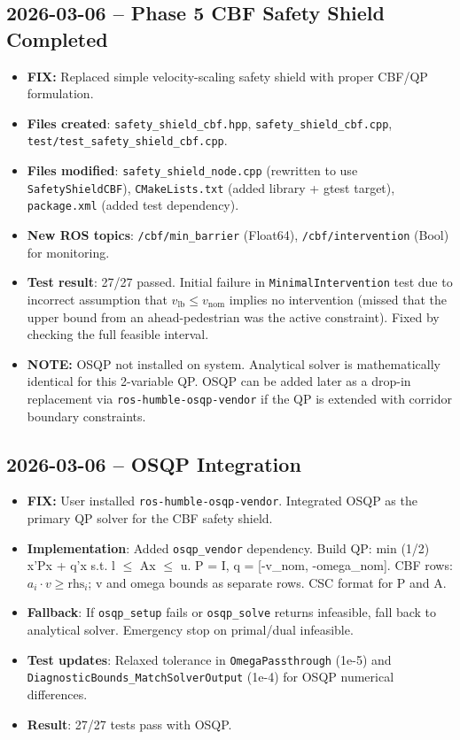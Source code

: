 \documentclass[11pt]{article}
\newcommand{\logentry}[1]{\subsection*{#1}}
\newcommand{\fix}[1]{\textcolor{fixgreen}{\textbf{FIX:} #1}}
\newcommand{\note}[1]{\textcolor{notblue}{\textbf{NOTE:} #1}}
\begin{document}
\logentry{2026-03-06 -- Phase 5 CBF Safety Shield Completed}
\begin{itemize}
  \item \fix{Replaced simple velocity-scaling safety shield with proper CBF/QP formulation.}
  \item \textbf{Files created}: \texttt{safety\_shield\_cbf.hpp}, \texttt{safety\_shield\_cbf.cpp}, \texttt{test/test\_safety\_shield\_cbf.cpp}.
  \item \textbf{Files modified}: \texttt{safety\_shield\_node.cpp} (rewritten to use \texttt{SafetyShieldCBF}), \texttt{CMakeLists.txt} (added library + gtest target), \texttt{package.xml} (added test dependency).
  \item \textbf{New ROS topics}: \texttt{/cbf/min\_barrier} (Float64), \texttt{/cbf/intervention} (Bool) for monitoring.
  \item \textbf{Test result}: 27/27 passed. Initial failure in \texttt{MinimalIntervention} test due to incorrect assumption that $v_{\text{lb}} \leq v_{\text{nom}}$ implies no intervention (missed that the upper bound from an ahead-pedestrian was the active constraint). Fixed by checking the full feasible interval.
  \item \note{OSQP not installed on system. Analytical solver is mathematically identical for this 2-variable QP. OSQP can be added later as a drop-in replacement via \texttt{ros-humble-osqp-vendor} if the QP is extended with corridor boundary constraints.}
\end{itemize}

\logentry{2026-03-06 -- OSQP Integration}
\begin{itemize}
  \item \fix{User installed \texttt{ros-humble-osqp-vendor}. Integrated OSQP as the primary QP solver for the CBF safety shield.}
  \item \textbf{Implementation}: Added \texttt{osqp\_vendor} dependency. Build QP: min (1/2) x'Px + q'x s.t. l $\leq$ Ax $\leq$ u. P = I, q = [-v\_nom, -omega\_nom]. CBF rows: $a_i \cdot v \geq \text{rhs}_i$; v and omega bounds as separate rows. CSC format for P and A.
  \item \textbf{Fallback}: If \texttt{osqp\_setup} fails or \texttt{osqp\_solve} returns infeasible, fall back to analytical solver. Emergency stop on primal/dual infeasible.
  \item \textbf{Test updates}: Relaxed tolerance in \texttt{OmegaPassthrough} (1e-5) and \texttt{DiagnosticBounds\_MatchSolverOutput} (1e-4) for OSQP numerical differences.
  \item \textbf{Result}: 27/27 tests pass with OSQP.
\end{itemize}
\end{document}
